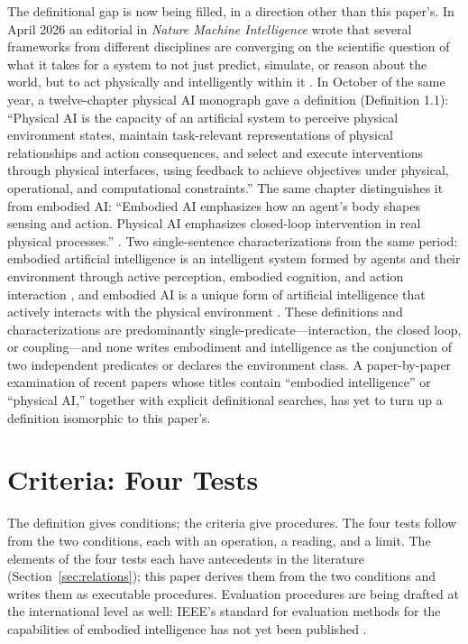 \documentclass[10pt]{article}
\begin{document}
The definitional gap is now being filled, in a direction other than this paper's. In April 2026 an editorial in \textit{Nature Machine Intelligence} wrote that several frameworks from different disciplines are converging on the scientific question of what it takes for a system to not just predict, simulate, or reason about the world, but to act physically and intelligently within it \cite{nmi2026}. In October of the same year, a twelve-chapter physical AI monograph gave a definition (Definition 1.1): ``Physical AI is the capacity of an artificial system to perceive physical environment states, maintain task-relevant representations of physical relationships and action consequences, and select and execute interventions through physical interfaces, using feedback to achieve objectives under physical, operational, and computational constraints.'' The same chapter distinguishes it from embodied AI: ``Embodied AI emphasizes how an agent's body shapes sensing and action. Physical AI emphasizes closed-loop intervention in real physical processes.'' \cite{monograph2026}. Two single-sentence characterizations from the same period: embodied artificial intelligence is an intelligent system formed by agents and their environment through active perception, embodied cognition, and action interaction \cite{tong2026}, and embodied AI is a unique form of artificial intelligence that actively interacts with the physical environment \cite{ma2026}. These definitions and characterizations are predominantly single-predicate---interaction, the closed loop, or coupling---and none writes embodiment and intelligence as the conjunction of two independent predicates or declares the environment class. A paper-by-paper examination of recent papers whose titles contain ``embodied intelligence'' or ``physical AI,'' together with explicit definitional searches, has yet to turn up a definition isomorphic to this paper's.

\section{Criteria: Four Tests}\label{sec:criteria}

The definition gives conditions; the criteria give procedures. The four tests follow from the two conditions, each with an operation, a reading, and a limit. The elements of the four tests each have antecedents in the literature (Section~\ref{sec:relations}); this paper derives them from the two conditions and writes them as executable procedures. Evaluation procedures are being drafted at the international level as well: IEEE's standard for evaluation methods for the capabilities of embodied intelligence has not yet been published \cite{ieee2025}.
\end{document}
